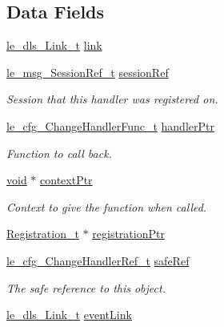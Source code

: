 \subsection*{Data Fields}
\begin{DoxyCompactItemize}
\item 
\hyperlink{structle__dls___link__t}{le\+\_\+dls\+\_\+\+Link\+\_\+t} \hyperlink{struct_handler__t_ab3c156fcf27a1eedf532bfd2fc8f4dab}{link}
\item 
\hyperlink{le__messaging_8h_aebfc01e15b430a5b4f3038a5bd518904}{le\+\_\+msg\+\_\+\+Session\+Ref\+\_\+t} \hyperlink{struct_handler__t_a8babaf56a3e0e02a82f034eee99747d8}{session\+Ref}
\begin{DoxyCompactList}\small\item\em Session that this handler was registered on. \end{DoxyCompactList}\item 
\hyperlink{le__cfg__interface_8h_ac9b4508a0faa6a5d91a4bace0b8976c0}{le\+\_\+cfg\+\_\+\+Change\+Handler\+Func\+\_\+t} \hyperlink{struct_handler__t_adae8221a05f19b32b02aefc73ce4bf9e}{handler\+Ptr}
\begin{DoxyCompactList}\small\item\em Function to call back. \end{DoxyCompactList}\item 
\hyperlink{_t_e_m_p_l_a_t_e__cdef_8h_ac9c84fa68bbad002983e35ce3663c686}{void} $\ast$ \hyperlink{struct_handler__t_a5a9faf6c8fe187387c62ddbef6311aa3}{context\+Ptr}
\begin{DoxyCompactList}\small\item\em Context to give the function when called. \end{DoxyCompactList}\item 
\hyperlink{struct_registration__t}{Registration\+\_\+t} $\ast$ \hyperlink{struct_handler__t_a12e13c23399fd619d22fc5b979494e31}{registration\+Ptr}
\item 
\hyperlink{le__cfg__interface_8h_ad02e652d8ea74b6e8ebb8125190e5244}{le\+\_\+cfg\+\_\+\+Change\+Handler\+Ref\+\_\+t} \hyperlink{struct_handler__t_a6c39728cb6b6e64da5f14b2803c0f6c2}{safe\+Ref}
\begin{DoxyCompactList}\small\item\em The safe reference to this object. \end{DoxyCompactList}\item 
\hyperlink{structle__dls___link__t}{le\+\_\+dls\+\_\+\+Link\+\_\+t} \hyperlink{struct_handler__t_a6153005130e7a0bb349252e79f9820d1}{event\+Link}

\end{DoxyCompactItemize}
